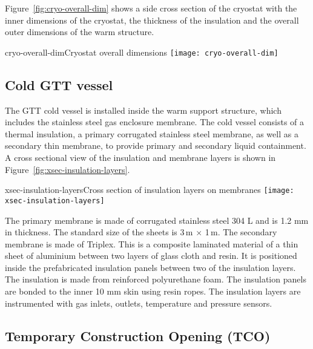 Figure~\ref{fig:cryo-overall-dim} shows a side cross section of the cryostat with the inner dimensions of the cryostat, 
the thickness of the insulation 
and the overall outer dimensions of the warm structure.

\begin{cdrfigure}{cryo-overall-dim}{Cryostat overall dimensions}
  \texttt{[image: cryo-overall-dim]}
\end{cdrfigure}


\subsection{Cold GTT vessel}

The GTT cold vessel is installed inside the warm support structure, which includes the stainless steel gas enclosure membrane. The cold vessel consists of a thermal insulation, a primary corrugated stainless steel membrane, as well as a secondary thin membrane, to provide primary and secondary liquid containment. A cross sectional view of the insulation and membrane layers is shown in Figure~\ref{fig:xsec-insulation-layers}.

\begin{cdrfigure}{xsec-insulation-layers}{Cross section of insulation layers on membranes}
  \texttt{[image: xsec-insulation-layers]}
\end{cdrfigure}


The primary membrane is made of corrugated stainless steel 304 L and is 1.2 mm in thickness.  The standard size of the sheets is 3\,m $\times$ 1\,m.  The secondary membrane is made of Triplex.  This is a composite laminated material of a thin sheet of aluminium between two layers of glass cloth and resin.  It is positioned inside the prefabricated insulation panels between two of the insulation layers.    The insulation is made from reinforced polyurethane foam.  The insulation panels are bonded to the inner 10 mm skin using resin ropes.  The insulation layers are instrumented with gas inlets, outlets, temperature and pressure sensors.


\subsection{Temporary Construction Opening (TCO)}

